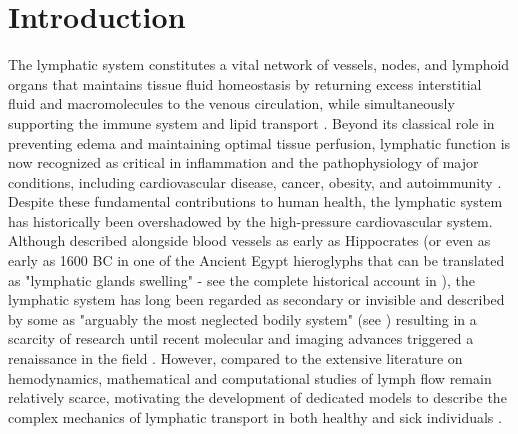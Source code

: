 \documentclass[12pt,a4paper]{article}
\begin{document}
\section{Introduction}
The lymphatic system constitutes a vital network of vessels, nodes, and lymphoid organs that maintains tissue fluid homeostasis by returning excess interstitial fluid and macromolecules to the venous circulation, while simultaneously supporting the immune system and lipid transport \cite{choi2012new}. Beyond its classical role in preventing edema and maintaining optimal tissue perfusion, lymphatic function is now recognized as critical in inflammation and the pathophysiology of major conditions, including cardiovascular disease, cancer, obesity, and autoimmunity \cite{escobedo2017lymphatic,mehrara2023emerging}. Despite these fundamental contributions to human health, the lymphatic system has historically been overshadowed by the high-pressure cardiovascular system. Although described alongside blood vessels as early as Hippocrates \cite{grotte1979discovery} (or even as early as 1600 BC in one of the Ancient Egypt hieroglyphs that can be translated as "lymphatic glands swelling" - see the complete historical account in \cite{van2022lymphatic}), the lymphatic system has long been regarded as secondary or invisible and described by some as "arguably the most neglected bodily system" (see \cite{mortimer2014new}) resulting in a scarcity of research until recent molecular and imaging advances triggered a renaissance in the field \cite{mehrara2023emerging,choi2012new,mills2024magnetic}. However, compared to the extensive literature on hemodynamics, mathematical and computational studies of lymph flow remain relatively scarce, motivating the development of dedicated models to describe the complex mechanics of lymphatic transport in both healthy and sick individuals \cite{jayathungage2024computational}.
\end{document}
